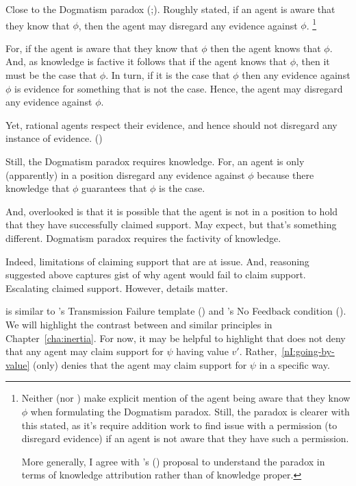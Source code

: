 \begin{note}
  Close to the Dogmatism paradox (\cite[39,43--45]{Kripke:2011wv};\cite[148]{Harman:1973ww}).
  Roughly stated, if an agent is aware that they know that \(\phi\), then the agent may disregard any evidence against \(\phi\).\nolinebreak
  \footnote{
    Neither \citeauthor{Kripke:2011wv} (nor \citeauthor{Harman:1973ww}) make explicit mention of the agent being aware that they know \(\phi\) when formulating the Dogmatism paradox.
    Still, the paradox is clearer with this stated, as it's require addition work to find issue with a permission (to disregard evidence) if an agent is not aware that they have such a permission.

    More generally, I agree with \citeauthor{Zhaoqing:2015vj}'s (\citeyear{Zhaoqing:2015vj}) proposal to understand the paradox in terms of knowledge attribution rather than of knowledge proper.
  }

  For, if the agent is aware that they know that \(\phi\) then the agent knows that \(\phi\).
  And, as knowledge is factive it follows that if the agent knows that \(\phi\), then it must be the case that \(\phi\).
  In turn, if it is the case that \(\phi\) then any evidence against \(\phi\) is evidence for something that is not the case.
  Hence, the agent may disregard any evidence against \(\phi\).

  Yet, rational agents respect their evidence, and hence should not disregard any instance of evidence.
  (\cite[Cf.][\S2]{Kelly:2016wk})

  Still, the Dogmatism paradox requires knowledge.
  For, an agent is only (apparently) in a position disregard any evidence against \(\phi\) because there knowledge that \(\phi\) guarantees that \(\phi\) is the case.

  And, overlooked is that it is possible that the agent is not in a position to hold that they have successfully claimed support.
  May expect, but that's something different.
  Dogmatism paradox requires the factivity of knowledge.

  Indeed, limitations of claiming support that are at issue.
  And, reasoning suggested above captures gist of why agent would fail to claim support.
  Escalating claimed support.
  However, details matter.
\end{note}

\begin{note}[Literature]

  \nI{} is similar to \citeauthor{Wright:2011wn}'s Transmission Failure template (\citeyear{Wright:2003aa,Wright:2011wn}) and \citeauthor{Weisberg:2010to}'s No Feedback condition (\citeyear{Weisberg:2010to}).
  We will highlight the contrast between \nI{} and similar principles in Chapter~\ref{cha:inertia}.
  For now, it may be helpful to highlight that \nI{} does not deny that any agent may claim support for \(\psi\) having value \(v'\).
  Rather,~\ref{nI:going-by-value} (only) denies that the agent may claim support for \(\psi\) in a specific way.
\end{note}

